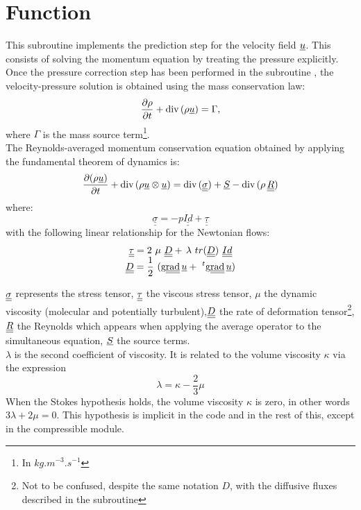 \section*{Function}
This subroutine implements the prediction step for the velocity field $\underline{u}$.
This consists of solving the momentum equation by treating the pressure explicitly.
Once the pressure correction step has been performed in the subroutine ,
the velocity-pressure solution is obtained using the mass conservation law:
\begin{equation}
\frac{\partial \rho } {\partial t}+ \text{div}\,(\rho \underline{u}) = \Gamma,
\end{equation}
where $\Gamma$ is the mass source term\footnote{In $kg.m^{-3}.s^{-1}$ }.\\
The Reynolds-averaged momentum conservation equation obtained by applying
the fundamental theorem of dynamics is:
\begin{equation}
\frac {\partial (\rho \underline{u})} {\partial t }+
\text{div}\,(\rho \underline{u} \otimes \underline{u}) =
\text{div}\,(\underline{\underline{\sigma}}) + \underline{S} - \text{div}\,{(\rho\,\underline{\underline{R}})}\end{equation}
where:
\begin{equation}
\underline{\underline{\sigma}} = - p \underline{\underline{Id}} + \underline{\underline{\tau }}
\end{equation}
with the following linear relationship for the Newtonian flows:
\begin{equation}
\begin{array}{lcl}
&\displaystyle \underline{\underline{\tau}} = 2\ \mu\ \underline{\underline{D}}
+\,
 \lambda\ tr(\underline{\underline{D }})\ \underline{\underline{Id}} &\\
&\displaystyle \underline{\underline{D}}=\frac{1}{2}\ (\ggrad \underline
{u} +\ ^t\ggrad \vect {u})
\end{array}
\end{equation}


$\underline{\underline{\sigma}}$ represents the stress tensor, $\underline{\underline{\tau}}$ the viscous stress tensor,
$\mu$ the dynamic viscosity (molecular and potentially turbulent),$\underline{\underline{D}}$
the rate of deformation tensor\footnote{Not to be confused, despite the same
notation $D$, with the diffusive fluxes described in the subroutine
}, $\underline{\underline{R}}$ the Reynolds which appears when applying the
average operator to the simultaneous equation, $\underline{S}$ the source
terms.\\
$\lambda$ is the second coefficient of viscosity. It is related to the volume viscosity
 $\kappa$ via the expression
\begin{equation}
\lambda=\kappa-\frac{2}{3}\mu
\end{equation}
When the Stokes hypothesis holds, the volume viscosity $\kappa$ is
zero, in other words $3\lambda+2\mu=0$. This hypothesis is implicit in the code
and in the rest of this, except in the compressible module.\\


